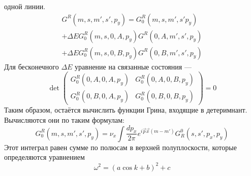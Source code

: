 \documentclass{article}
\begin{document}
	одной линии.
	\begin{multline}
		G^R(m,s,m',s',p_y) = G^R_0(m,s,m',s'p_y)  \\
			+\Delta E G^R_0(m,s,0,A,p_y)G^R(0,A,m',s',p_y)  \\
						+\Delta E G^R_0(m,s,0,B,p_y)G^R(0,B,m',s',p_y) 
	\end{multline}
	Для бесконечного $\Delta E$ уравнение на связанные состояния ---
	\begin{equation}
		\operatorname{det} 
		\left(\begin{matrix}
			G^R_0(0,A,0,A,p_y) & G^R_0(0,A,0,B,p_y) \\
			G^R_0(0,B,0,A,p_y) & G^R_0(0,B,0,B,p_y) 
		\end{matrix}\right) = 0
	\end{equation}
	Таким образом, остаётся вычислить функции Грина, входящие в детеримнант. Вычисляются они 
	по таким формулам:
	\begin{equation}
		G_0^R(m,s,m',s',p_y) = 
			\nu_x\int \frac{dp_x}{2\pi} e^{i\vec{p}\vec{x}(m-m')} G^0_R(s,s',p_x,p_y)
	\end{equation}
	Этот интеграл равен сумме по полюсам в верхней полуплоскости, которые определяются уравнением
	\begin{equation}
		\omega^2 = (a\cos{k} + b)^2 + c
	\end{equation}
\end{document}
